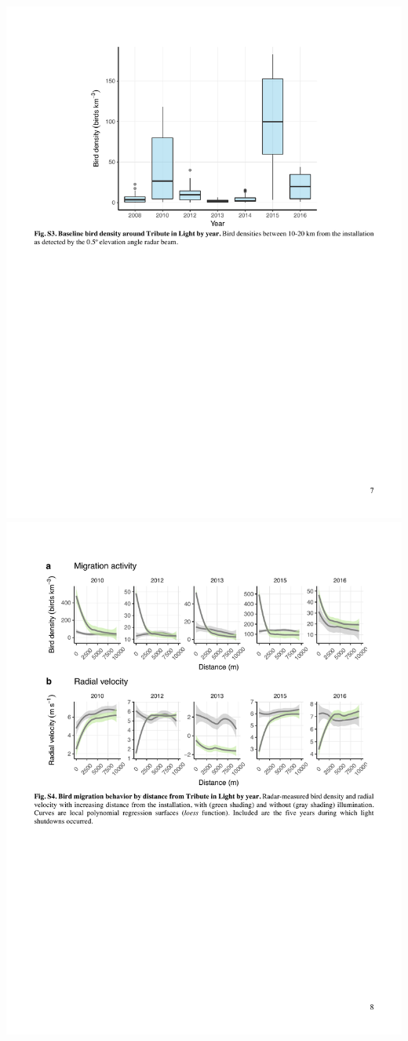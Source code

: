 \documentclass[a4paper, twoside]{templates/ociamthesis}
\begin{document}
\includegraphics[width=1\linewidth]{pdf_chapters/lights/lights_supp_crop_Part11}
\includegraphics[width=1\linewidth]{pdf_chapters/lights/lights_supp_crop_Part12}
\end{document}
